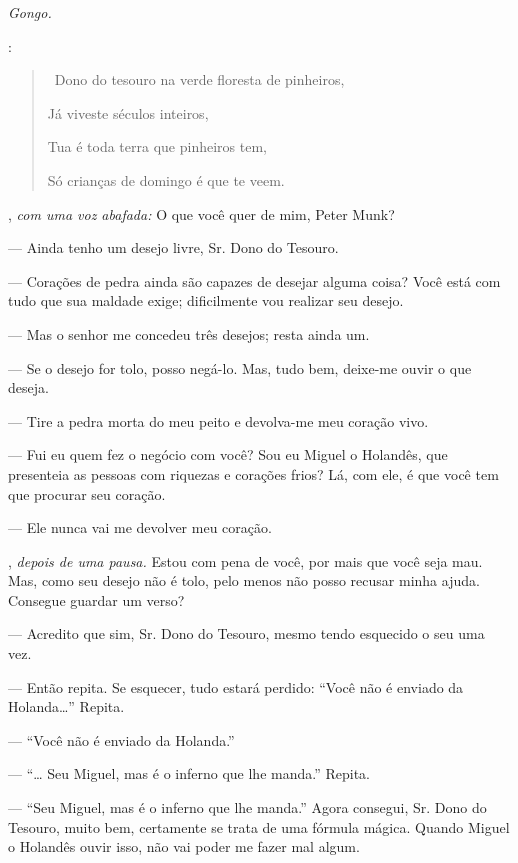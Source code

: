 \begin{myparindent}{0pt}
\begin{Parskip}
\emph{Gongo.}

:

\begin{quote}
\quad \, Dono do tesouro na verde floresta de pinheiros,

Já viveste séculos inteiros,

Tua é toda terra que pinheiros tem,

Só crianças de domingo é que te veem.
\end{quote}

, \emph{com uma voz abafada:} O que você quer de mim, Peter
Munk?

 --- Ainda tenho um desejo livre, Sr. Dono do Tesouro.

 --- Corações de pedra ainda são capazes de desejar alguma
coisa? Você está com tudo que sua maldade exige; dificilmente vou
realizar seu desejo.

 --- Mas o senhor me concedeu três desejos; resta ainda um.

 --- Se o desejo for tolo, posso negá-lo. Mas, tudo bem,
deixe-me ouvir o que deseja.

 --- Tire a pedra morta do meu peito e devolva-me meu coração vivo.

 --- Fui eu quem fez o negócio com você? Sou eu Miguel o
Holandês, que presenteia as pessoas com riquezas e corações frios? Lá,
com ele, é que você tem que procurar seu coração.

 --- Ele nunca vai me devolver meu coração.

, \emph{depois de uma pausa.} Estou com pena de você, por
mais que você seja mau. Mas, como seu desejo não é tolo, pelo menos não
posso recusar minha ajuda. Consegue guardar um verso?

 --- Acredito que sim, Sr. Dono do Tesouro, mesmo tendo esquecido o
seu uma vez.

 --- Então repita. Se esquecer, tudo estará perdido: ``Você
não é enviado da Holanda\ldots{}'' Repita.

 --- ``Você não é enviado da Holanda.''

 --- ``\ldots{} Seu Miguel, mas é o inferno que lhe manda.''
Repita.

 --- ``Seu Miguel, mas é o inferno que lhe manda.'' Agora consegui,
Sr. Dono do Tesouro, muito bem, certamente se trata de uma fórmula
mágica. Quando Miguel o Holandês ouvir isso, não vai poder me fazer mal
algum.


\end{Parskip}
\end{myparindent}

